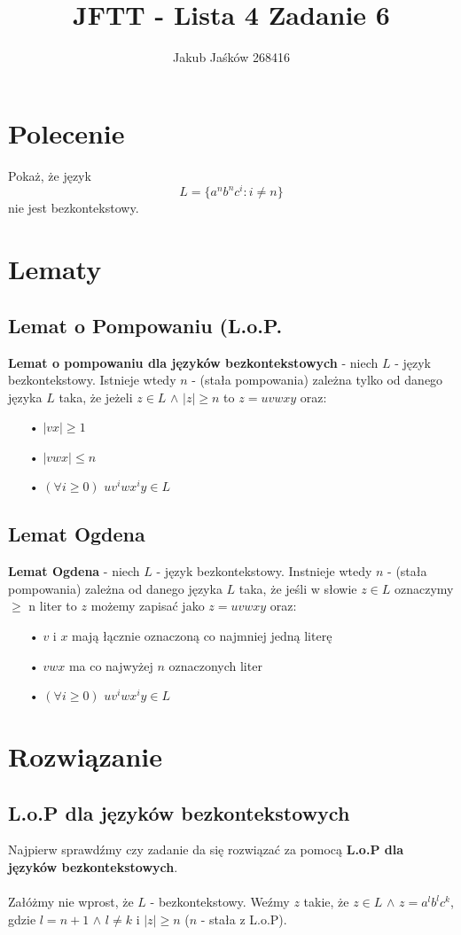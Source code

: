 \documentclass{article}
\begin{document}
\title{JFTT - Lista 4 Zadanie 6}
\author{Jakub Jaśków 268416}
\maketitle

\section*{Polecenie}
Pokaż, że język $$ L= \{a^nb^nc^i : i \neq n\} $$ nie jest bezkontekstowy.

\section*{Lematy}
\subsection*{Lemat o Pompowaniu (L.o.P.}
\textbf{Lemat o pompowaniu dla języków bezkontekstowych} - niech $L$ - język bezkontekstowy. Istnieje wtedy $n$ - (stała pompowania) zależna tylko od danego języka $L$ taka, że jeżeli $z \in L$ $\wedge$ $|z| \geq n$ to $z = uvwxy$ oraz:
\begin{itemize}
\item[•] $|vx| \geq 1$
\item[•] $|vwx| \leq n$
\item[•] $(\forall i \geq 0)$ $uv^iwx^iy \in L$
\end{itemize}
\subsection*{Lemat Ogdena}
\textbf{Lemat Ogdena} - niech $L$ - język bezkontekstowy. Instnieje wtedy $n$ - (stała pompowania) zależna od danego języka $L$ taka, że jeśli w słowie $ z \in L$ oznaczymy $\geq$ n liter to $z$ możemy zapisać jako $z = uvwxy$ oraz:
\begin{itemize}
\item[•] $v$ i $x$ mają łącznie oznaczoną co najmniej jedną literę
\item[•] $vwx$ ma co najwyżej $n$ oznaczonych liter
\item[•] $(\forall i \geq 0)$ $uv^iwx^iy \in L$
\end{itemize}
\section*{Rozwiązanie}
\subsection{L.o.P dla języków bezkontekstowych}
Najpierw sprawdźmy czy zadanie da się rozwiązać za pomocą \textbf{L.o.P dla języków bezkontekstowych}.\\\\
Załóżmy nie wprost, że $L$ - bezkontekstowy. Weźmy $z$ takie, że $z \in L$ $\wedge$ $z = a^lb^lc^k$, gdzie $l = n + 1$ $\wedge$ $l \neq k$ i $|z| \geq n$ ($n$ - stała z L.o.P).
\end{document}
